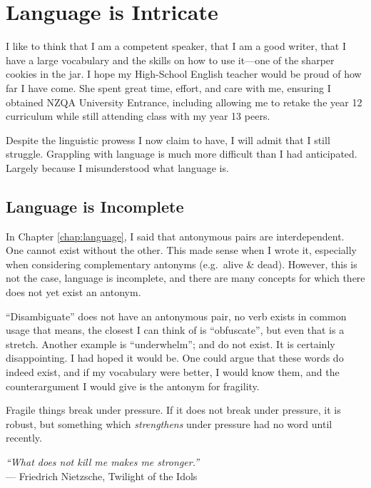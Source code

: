 \chapter{Language is Intricate}

I like to think that I am a competent speaker, that I am a good writer, that I have a large vocabulary and the skills on how to use it—one of the sharper cookies in the jar. I hope my High-School English teacher would be proud of how far I have come. She spent great time, effort, and care with me, ensuring I obtained NZQA University Entrance, including allowing me to retake the year 12 curriculum while still attending class with my year 13 peers.

Despite the linguistic prowess I now claim to have, I will admit that I still struggle. Grappling with language is much more difficult than I had anticipated. Largely because I misunderstood what language is.

\section{Language is Incomplete}

In Chapter \ref{chap:language}, I said that antonymous pairs are interdependent. One cannot exist without the other. This made sense when I wrote it, especially when considering complementary antonyms (e.g.\ alive \& dead). However, this is not the case, language is incomplete, and there are many concepts for which there does not yet exist an antonym.

``Disambiguate'' does not have an antonymous pair, no verb exists in common usage that means, the closest I can think of is ``obfuscate'', but even that is a stretch. Another example is ``underwhelm''; and do not exist. It is certainly disappointing. I had hoped it would be. One could argue that these words do indeed exist, and if my vocabulary were better, I would know them, and the counterargument I would give is the antonym for fragility. 

\newpage
Fragile things break under pressure. If it does not break under pressure, it is robust, but something which \textit{strengthens} under pressure had no word until recently.

\begin{center}
\textit{``What does not kill me makes me stronger.''}
\\ --- Friedrich Nietzsche, Twilight of the Idols
\end{center}

